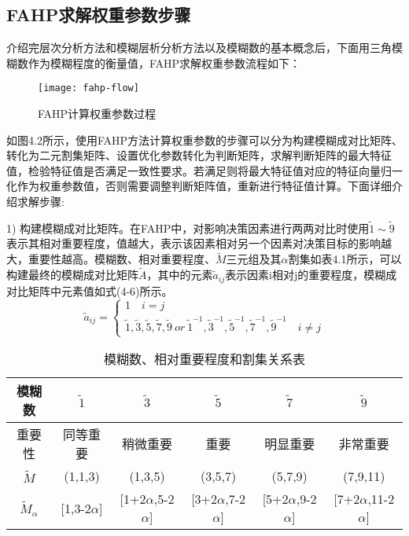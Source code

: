 \subsection{FAHP求解权重参数步骤}
介绍完层次分析方法和模糊层析分析方法以及模糊数的基本概念后，下面用三角模糊数作为模糊程度的衡量值，FAHP求解权重参数流程如下：
\begin{figure}[H] %
	\centering
	\texttt{[image: fahp-flow]}
	\caption{FAHP计算权重参数过程}
\end{figure}
如图4.2所示，使用FAHP方法计算权重参数的步骤可以分为构建模糊成对比矩阵、转化为二元割集矩阵、设置优化参数转化为判断矩阵，求解判断矩阵的最大特征值，检验特征值是否满足一致性要求。若满足则将最大特征值对应的特征向量归一化作为权重参数值，否则需要调整判断矩阵值，重新进行特征值计算。下面详细介绍求解步骤:

1) 构建模糊成对比矩阵。在FAHP中，对影响决策因素进行两两对比时使用\begin{math}\widetilde{1}\sim \widetilde{9}\end{math}表示其相对重要程度，值越大，表示该因素相对另一个因素对决策目标的影响越大，重要性越高。模糊数、相对重要程度、$\widetilde{M}$三元组及其$\alpha$割集如表4.1所示，可以构建最终的模糊成对比矩阵$\widetilde{A} $，其中的元素$\widetilde{a}_{ij} $表示因素i相对j的重要程度，模糊成对比矩阵中元素值如式(4-6)所示。
\begin{equation}
\widetilde{a}_{ij} = \left\{\begin{array}{l}
1 \quad i=j \\ [0.2cm]
\widetilde{1},\widetilde{3},\widetilde{5},\widetilde{7},\widetilde{9}\ or\ \widetilde{1}^{-1},\widetilde{3}^{-1},\widetilde{5}^{-1},\widetilde{7}^{-1},\widetilde{9}^{-1} \quad i\not=j  
\end{array}\right.
\end{equation}
\begin{table}[htbp]
	\centering\dawu[1.3]
	\caption{模糊数、相对重要程度和割集关系表}
	\begin{tabular}{|c|c|c|c|c|c|} \hline
		模糊数 & $\widetilde{1}$ & $\widetilde{3}$ & $\widetilde{5}$  & $\widetilde{7}$ & $\widetilde{9}$ \\ \hline
		重要性 & 同等重要 & 稍微重要 & 重要 & 明显重要 & 非常重要 \\ \hline 
		$\widetilde{M}$ & (1,1,3) & (1,3,5) & (3,5,7) & (5,7,9) & (7,9,11) \\ \hline 
		$\widetilde{M}_{\alpha}$ & [1,3-2$\alpha$] & [1+2$\alpha$,5-2$\alpha$] & [3+2$\alpha$,7-2$\alpha$] & [5+2$\alpha$,9-2$\alpha$] & [7+2$\alpha$,11-2$\alpha$]\\ \hline 
	\end{tabular}
\end{table}

